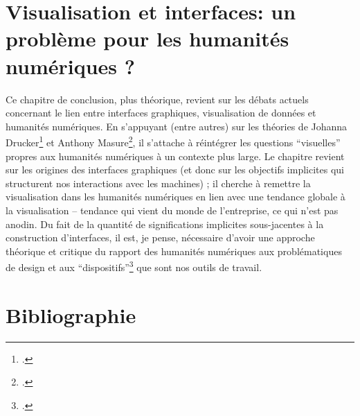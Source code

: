\documentclass[a4paper, 12pt, twoside]{book}
\begin{document}
\chapter{Visualisation et interfaces: un problème pour les humanités numériques ?}
Ce chapitre de conclusion, plus théorique, revient sur les débats actuels concernant le lien entre interfaces graphiques, visualisation de données et humanités numériques. En s'appuyant (entre autres) sur les théories de Johanna Drucker\footcite{drucker_visualisation_2020} et Anthony Masure\footcite{masure_design_2017}, il s'attache à réintégrer les questions \enquote{visuelles} propres aux humanités numériques à un contexte plus large. Le chapitre revient sur les origines des interfaces graphiques (et donc sur les objectifs implicites qui structurent nos interactions avec les machines) ; il cherche à remettre la visualisation dans les humanités numériques en lien avec une tendance globale à la visualisation -- tendance qui vient du monde de l'entreprise, ce qui n'est pas anodin. Du fait de la quantité de significations implicites sous-jacentes à la construction d'interfaces, il est, je pense, nécessaire d'avoir une approche théorique et critique du rapport des humanités numériques aux problématiques de design et aux \enquote{dispositifs}\footcite{agamben_what_2009} que sont nos outils de travail.





\pagebreak
\chapter*{Bibliographie}
\printbibliography[heading=subbibintoc,keyword={katabase},title={À propos du projet Katabase / MSS}]
\printbibliography[heading=subbibintoc,keyword={visualisation},title={Visualisation et design d'interfaces}]
\printbibliography[heading=subbibintoc,keyword={econometrie},title={Économétrie et statistiques}]




\tableofcontents
\end{document}

